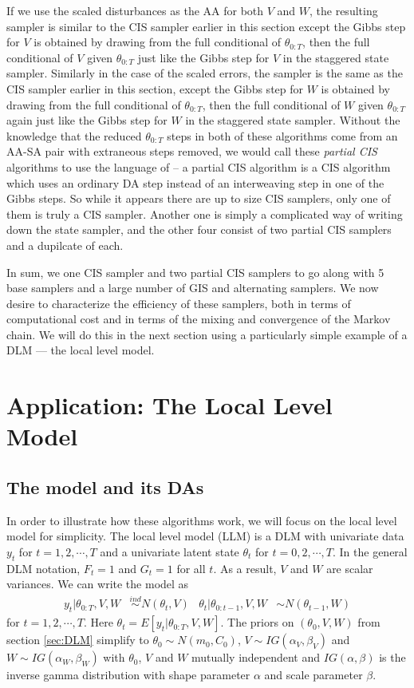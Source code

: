 \documentclass{article}
\begin{document}
If we use the scaled disturbances as the AA for both $V$ and $W$, the resulting sampler is similar to the CIS sampler earlier in this section except the Gibbs step for $V$ is obtained by drawing from the full conditional of $\theta_{0:T}$, then the full conditional of $V$ given $\theta_{0:T}$ just like the Gibbs step for $V$ in the staggered state sampler. Similarly in the case of the scaled errors, the sampler is the same as the CIS sampler earlier in this section, except the Gibbs step for $W$ is obtained by drawing from the full conditional of $\theta_{0:T}$, then the full conditional of $W$ given $\theta_{0:T}$ again just like the Gibbs step for $W$ in the staggered state sampler. Without the knowledge that the reduced $\theta_{0:T}$ steps in both of these algorithms come from an AA-SA pair with extraneous steps removed, we would call these {\it partial CIS} algorithms to use the language of  -- a partial CIS algorithm is a CIS algorithm which uses an ordinary DA step instead of an interweaving step in one of the Gibbs steps. So while it appears there are up to size CIS samplers, only one of them is truly a CIS sampler. Another one is simply a complicated way of writing down the state sampler, and the other four consist of two partial CIS samplers and a dupilcate of each.

In sum, we one CIS sampler and two partial CIS samplers to go along with 5 base samplers and a large number of GIS and alternating samplers. We now desire to characterize the efficiency of these samplers, both in terms of computational cost and in terms of the mixing and convergence of the Markov chain. We will do this in the next section using a particularly simple example of a DLM --- the local level model.

\section{Application: The Local Level Model}\label{sec:LLM}

\subsection{The model and its DAs}

In order to illustrate how these algorithms work, we will focus on the local level model for simplicity. The local level model (LLM) is a DLM with univariate data $y_t$ for $t=1,2,\cdots,T$ and a univariate latent state $\theta_t$ for $t=0,2,\cdots,T$. In the general DLM notation, $F_t=1$ and $G_t=1$ for all $t$. As a result, $V$ and $W$ are scalar variances. We can write the model as
\begin{align}
  y_t |\theta_{0:T},V,W& \stackrel{ind}{\sim} N(\theta_t,V) & 
  \theta_t |\theta_{0:t-1},V,W& \sim N(\theta_{t-1},W) 
\end{align}
for $t=1,2,\cdots,T$. Here $\theta_t=E[y_t|\theta_{0:T},V,W]$. The priors on $(\theta_0,V,W)$ from section \ref{sec:DLM} simplify to $\theta_0\sim N(m_0,C_0)$, $V\sim IG(\alpha_V,\beta_V)$ and $W\sim IG(\alpha_W,\beta_W)$ with $\theta_0$, $V$ and $W$ mutually independent and $IG(\alpha,\beta)$ is the inverse gamma distribution with shape parameter $\alpha$ and scale parameter $\beta$. 
\end{document}
